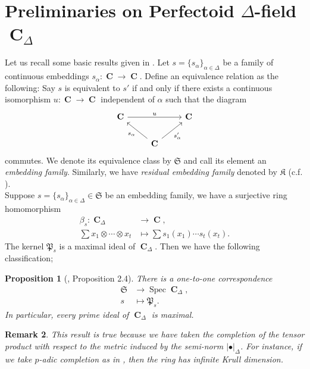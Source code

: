 \documentclass{amsart}
\newtheorem{proposition}{Proposition}[section]
\newtheorem{remark}[proposition]{Remark}
\DeclareMathOperator{\spec}{Spec}
\DeclareMathOperator{\C}{\textbf{C}}
\begin{document}

\section{Preliminaries on Perfectoid $\Delta$-field $\C_\Delta$}

Let us recall some basic results given in \cite{Pok-Pal}. Let $s=\{s_\alpha\}_{\alpha\in\Delta}$ be a family of continuous embeddings $s_\alpha:\C\to \C$. Define an equivalence relation as the following: Say $s$ is equivalent to $s'$ if and only if there exists a continuous isomorphism $u:\C\to \C$ independent of $\alpha$ such that the diagram
\[
\begin{tikzcd}
    \C\arrow[rr,"u"] &  &  \C\\
        &\arrow[ul,"s_\alpha"] \C \arrow[ru,swap,"s'_\alpha"]&
\end{tikzcd}
\]
commutes. We denote its equivalence class by $\mathfrak{S}$ and call its element an \emph{embedding family}. Similarly, we have \emph{residual embedding family} denoted by $\mathfrak{K}$ (c.f. \cite{Pok-Pal}).\\

Suppose $s=\{s_\alpha\}_{\alpha\in\Delta}\in\mathfrak{S}$ be an embedding family, we have a surjective ring homomorphism 
\begin{align*}
    \beta_s: \C_\Delta&\to \C,\\
             \sum x_1\otimes\cdots\otimes x_t&\mapsto \sum s_1(x_1)\cdots s_t(x_t).
\end{align*}
The kernel $\mathfrak{P}_s$ is a maximal ideal of $\C_\Delta$. Then we have the following classification;

\begin{proposition}[\cite{Pok-Pal}, Proposition 2.4]
    There is a one-to-one correspondence
    \begin{align*}
        \mathfrak{S}&\to \spec\C_\Delta,\\
                  s &\mapsto \mathfrak{P}_s.
    \end{align*}
    In particular, every prime ideal of $\C_\Delta$ is maximal.
\end{proposition}

\begin{remark}
    This result is true because we have taken the completion of the tensor product with respect to the metric induced by the semi-norm $|\bullet|_\Delta$. For instance, if we take $p$-adic completion as in \cite{BCM}, then the ring has infinite Krull dimension.
\end{remark}
\end{document}
